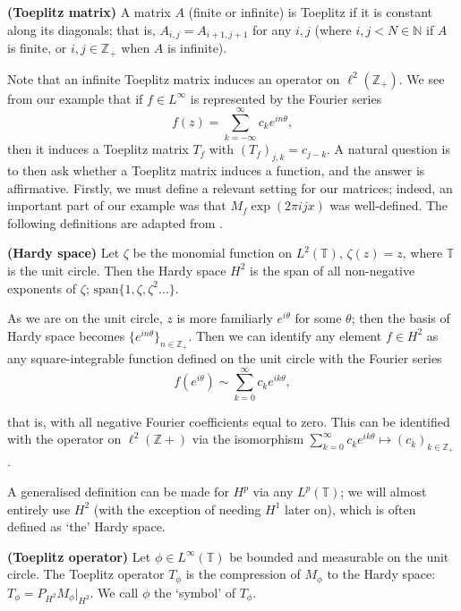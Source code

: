 \documentclass[../main.tex]{subfiles}
\begin{document}
\begin{definition}{\textbf{(Toeplitz matrix)}}
  A matrix $A$ (finite or infinite) is Toeplitz if it is constant along its
  diagonals; that is, $A_{i,j} = A_{i+1,j+1}$ for any $i, j$ (where $i,j <
  N \in \mathbb{N}$ if $A$ is finite, or $i,j \in \mathbb{Z}_+$ when $A$
  is infinite).
\end{definition}

Note that an infinite Toeplitz matrix induces an operator on
$\ell^2(\mathbb{Z}_+)$. We see from our example that if $f \in L^\infty$ is
represented by the Fourier series
$$f(z) = \sum_{k=-\infty}^{\infty} c_k e^{i n \theta},$$
then it induces a Toeplitz matrix $T_f$ with $(T_f)_{j,k} = c_{j-k}$. A natural
question is to then ask whether a Toeplitz matrix induces a function, and the
answer is affirmative. Firstly, we must define a relevant setting for our
matrices; indeed, an important part of our
example was that $M_f \exp(2 \pi i j x)$ was well-defined. The following
definitions are adapted from \parencite{arveson2002short}.

\begin{definition}{\textbf{(Hardy space)}}
  Let $\zeta$ be the monomial function on $L^2(\mathbb{T})$, $\zeta(z) = z$, where
  $\mathbb{T}$ is the unit circle. Then the Hardy space $H^2$ is the span
  of all non-negative exponents of $\zeta$; $\text{span}\{1, \zeta,
  \zeta^2 \hdots\}$.
\end{definition}

As we are on the unit circle, $z$ is more familiarly $e^{i \theta}$ for some
$\theta$; then the basis of Hardy space becomes $\{e^{i n \theta}\}_{n \in
\mathbb{Z}_+}$. Then we can identify any element $f \in H^2$ as any
square-integrable function defined on the unit circle with the Fourier series
$$f(e^{i \theta}) \sim \sum_{k=0}^\infty c_k e^{i k \theta},$$

that is, with all negative Fourier coefficients equal to zero. This can be
identified with the operator on $\ell^2(\mathbb{Z}+)$ via the isomorphism
$\sum_{k=0}^\infty c_k e^{i k \theta} \mapsto (c_k)_{k \in \mathbb{Z}_+}$
\parencite{bottcher1990analysis}.

A generalised definition can be made for $H^p$ via any $L^p(\mathbb{T})$; we
will almost entirely use $H^2$ (with the exception of needing $H^1$ later on),
which is often defined as `the' Hardy space.

\begin{definition}{\textbf{(Toeplitz operator)}}
  Let $\phi \in L^{\infty}(\mathbb{T})$ be bounded and measurable on the unit
  circle. The Toeplitz operator $T_\phi$ is the compression of $M_\phi$ to
  the Hardy space: $T_{\phi} = P_{H^2} M_\phi \big|_{H^2}$. We call $\phi$
  the `symbol' of $T_\phi$.
\end{definition}
\end{document}
